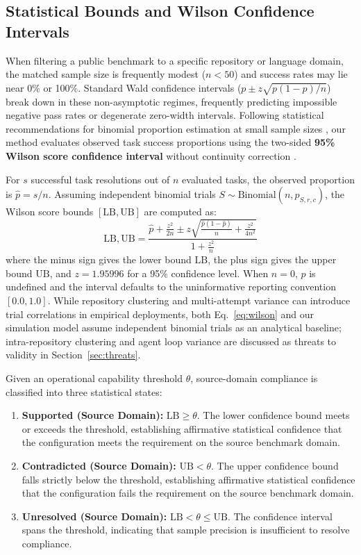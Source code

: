 \documentclass[runningheads]{llncs}
\begin{document}
\subsection{Statistical Bounds and Wilson Confidence Intervals}
When filtering a public benchmark to a specific repository or language domain, the matched sample size is frequently modest ($n < 50$) and success rates may lie near 0\% or 100\%. Standard Wald confidence intervals ($p \pm z \sqrt{p(1-p)/n}$) break down in these non-asymptotic regimes, frequently predicting impossible negative pass rates or degenerate zero-width intervals. Following statistical recommendations for binomial proportion estimation at small sample sizes \cite{brown_cai_dasgupta_2001,aera_apa_ncme_standards_2014}, our method evaluates observed task success proportions using the two-sided \textbf{95\% Wilson score confidence interval} without continuity correction \cite{wilson_probable_inference_1927}. 

For $s$ successful task resolutions out of $n$ evaluated tasks, the observed proportion is $\hat{p} = s/n$. Assuming independent binomial trials $S \sim \text{Binomial}(n, p_{S,r,c})$, the Wilson score bounds $[\text{LB}, \text{UB}]$ are computed as:
\begin{equation}
\label{eq:wilson}
\text{LB}, \text{UB} = \frac{\hat{p} + \frac{z^2}{2n} \pm z \sqrt{\frac{\hat{p}(1-\hat{p})}{n} + \frac{z^2}{4n^2}}}{1 + \frac{z^2}{n}}
\end{equation}
where the minus sign gives the lower bound $\text{LB}$, the plus sign gives the upper bound $\text{UB}$, and $z = 1.95996$ for a 95\% confidence level. When $n = 0$, $\hat{p}$ is undefined and the interval defaults to the uninformative reporting convention $[0.0, 1.0]$. While repository clustering and multi-attempt variance can introduce trial correlations in empirical deployments, both Eq.~\ref{eq:wilson} and our simulation model assume independent binomial trials as an analytical baseline; intra-repository clustering and agent loop variance are discussed as threats to validity in Section~\ref{sec:threats}.

Given an operational capability threshold $\theta$, source-domain compliance is classified into three statistical states:
\begin{enumerate}[leftmargin=*]
    \item \textbf{Supported (Source Domain):} $\text{LB} \ge \theta$. The lower confidence bound meets or exceeds the threshold, establishing affirmative statistical confidence that the configuration meets the requirement on the source benchmark domain.
    \item \textbf{Contradicted (Source Domain):} $\text{UB} < \theta$. The upper confidence bound falls strictly below the threshold, establishing affirmative statistical confidence that the configuration fails the requirement on the source benchmark domain.
    \item \textbf{Unresolved (Source Domain):} $\text{LB} < \theta \le \text{UB}$. The confidence interval spans the threshold, indicating that sample precision is insufficient to resolve compliance.
\end{enumerate}
\end{document}
